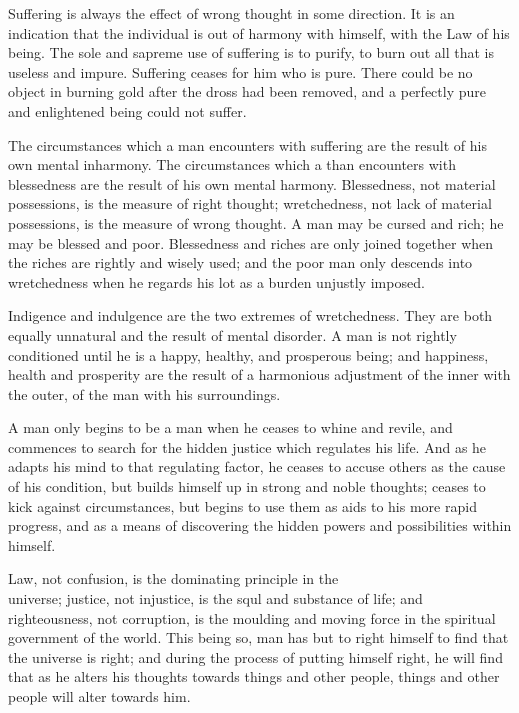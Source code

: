 \documentclass[10pt]{article}
\begin{document}
Suffering is always the effect of wrong thought in some direction. It is an indication that the individual is out of harmony with himself, with the Law of his being. The sole and sapreme use of suffering is to purify, to burn out all that is useless and impure. Suffering ceases for him who is pure. There could be no object in burning gold after the dross had been removed, and a perfectly pure and enlightened being could not suffer.

The circumstances which a man encounters with suffering are the result of his own mental inharmony. The circumstances which a than encounters with blessedness are the result of his own mental harmony. Blessedness, not material possessions, is the measure of right thought; wretchedness, not lack of material possessions, is the measure of wrong thought. A man may be cursed and rich; he may be blessed and poor. Blessedness and riches are only joined together when the riches are rightly and wisely used; and the poor man only descends into wretchedness when he regards his lot as a burden unjustly imposed.

Indigence and indulgence are the two extremes of wretchedness. They are both equally unnatural and the result of mental disorder. A man is not rightly conditioned until he is a happy, healthy, and prosperous being; and happiness, health and prosperity are the result of a harmonious adjustment of the inner with the outer, of the man with his surroundings.

A man only begins to be a man when he ceases to whine and revile, and commences to search for the hidden justice which regulates his life. And as he adapts his mind to that regulating factor, he ceases to accuse others as the cause of his condition, but builds himself up in strong and noble thoughts; ceases to kick against circumstances, but begins to use them as aids to his more rapid progress, and as a means of discovering the hidden powers and possibilities within himself.

Law, not confusion, is the dominating principle in the\\
universe; justice, not injustice, is the squl and substance of life; and righteousness, not corruption, is the moulding and moving force in the spiritual government of the world. This being so, man has but to right himself to find that the universe is right; and during the process of putting himself right, he will find that as he alters his thoughts towards things and other people, things and other people will alter towards him.
\end{document}
